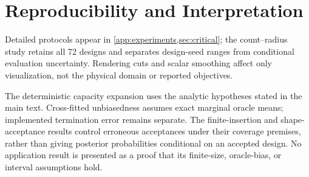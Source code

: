 \section{Reproducibility and Interpretation}
\label{app:checklist}
\label{app:claims}

Detailed protocols appear in \cref{app:experiments,sec:critical}; the count--radius study retains all 72 designs and separates design-seed ranges from conditional evaluation uncertainty. Rendering cuts and scalar smoothing affect only visualization, not the physical domain or reported objectives.

The deterministic capacity expansion uses the analytic hypotheses stated in the main text. Cross-fitted unbiasedness assumes exact marginal oracle means; implemented termination error remains separate. The finite-insertion and shape-acceptance results control erroneous acceptances under their coverage premises, rather than giving posterior probabilities conditional on an accepted design. No application result is presented as a proof that its finite-size, oracle-bias, or interval assumptions hold.
